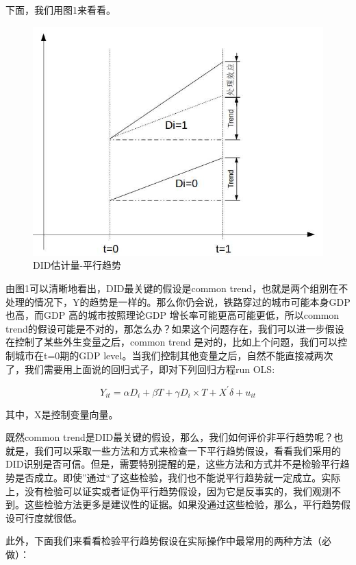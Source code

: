 \documentclass[cn,12pt,math=newtx,citestyle=gb7714-2015,bibstyle=gb7714-2015]{elegantbook}
\begin{document}
	
	下面，我们用图1来看看。
	\begin{figure}[htbp]
		\centering
		\includegraphics[width=1\textwidth]{commontrend.jpg}
		\caption{DID估计量-平行趋势}\label{fig:digit}
	\end{figure}
	
	由图1可以清晰地看出，DID最关键的假设是common trend，也就是两个组别在不处理的情况下，Y的趋势是一样的。那么你仍会说，铁路穿过的城市可能本身GDP也高，而GDP 高的城市按照理论GDP 增长率可能更高可能更低，所以common trend的假设可能是不对的，那怎么办？如果这个问题存在，我们可以进一步假设在控制了某些外生变量之后，common trend 是对的，比如上个问题，我们可以控制城市在t=0期的GDP level。当我们控制其他变量之后，自然不能直接减两次了，我们需要用上面说的回归式子，即对下列回归方程run OLS:
	
	\begin{equation}
		Y_{it}=\alpha{D}_i+\beta{T}+\gamma{D_i\times{T}}+X^{'}\delta+u_{it}
	\end{equation}
	
	其中，X是控制变量向量。
	
	既然common trend是DID最关键的假设，那么，我们如何评价非平行趋势呢？也就是，我们可以采取一些方法和方式来检查一下平行趋势假设，看看我们采用的DID识别是否可信。但是，需要特别提醒的是，这些方法和方式并不是检验平行趋势是否成立。即使”通过“了这些检验，我们也不能说平行趋势就一定成立。实际上，没有检验可以证实或者证伪平行趋势假设，因为它是反事实的，我们观测不到。这些检验方法更多是建议性的证据。如果没通过这些检验，那么，平行趋势假设可行度就很低。
	
	此外，下面我们来看看检验平行趋势假设在实际操作中最常用的两种方法（必做）：
	
\end{document}
